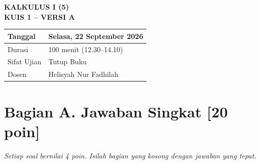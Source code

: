 \documentclass[12pt,a4paper]{article}
\begin{document}
\begin{center}
  \textbf{\Large KALKULUS I (5)}\\[0.2cm]
  \textbf{\large KUIS 1 -- VERSI A}\\[0.3cm]
  \begin{tabular}{|l|l|}
    \hline
    Tanggal     & Selasa, 22 September 2026 \\ \hline
    Durasi      & 100 menit (12.30--14.10)  \\ \hline
    Sifat Ujian & Tutup Buku                \\ \hline
    Dosen       & Helisyah Nur Fadhilah      \\ \hline
  \end{tabular}
\end{center}

\section*{Bagian A. Jawaban Singkat \hfill [20 poin]}
\textit{Setiap soal bernilai 4 poin. Isilah bagian yang kosong dengan jawaban yang tepat.}
\end{document}
